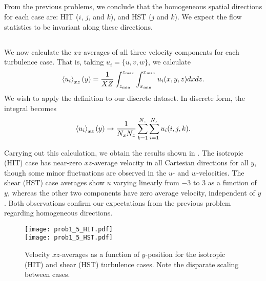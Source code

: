 \documentclass[11pt]{article}
\begin{document}
\subsection{}

From the previous problems, we conclude that the homogeneous spatial directions for each case are: HIT ($i$, $j$, and $k$), and HST ($j$ and $k$). We expect the flow statistics to be invariant along these directions.

\subsection{}

We now calculate the $xz$-averages of all three velocity components for each turbulence case. That is, taking $u_i = \{ u, v, w \}$, we calculate
\begin{equation}
\left< u_i \right>_{xz}(y)
=
\frac{1}{XZ}
\int_{z_\text{min}}^{z_\text{max}}
\int_{x_\text{min}}^{x_\text{max}}
u_i(x,y,z) dx dz
.
\end{equation}
We wish to apply the definition to our discrete dataset. In discrete form, the integral becomes
\begin{equation}
\left< u_i \right>_{xz}(y)
\rightarrow
\frac{1}{N_x N_z}
\sum_{k=1}^{N_z}
\sum_{i=1}^{N_x}
u_i(i,j,k)
.
\end{equation}

Carrying out this calculation, we obtain the results shown in . The isotropic (HIT) case has near-zero $xz$-average velocity in all Cartesian directions for all $y$, though some minor fluctuations are observed in the $u$- and $w$-velocities. The shear (HST) case averages show $u$ varying linearly from $-3$ to $3$ as a function of $y$, whereas the other two components have zero average velocity, independent of $y$. Both observations confirm our expectations from the previous problem regarding homogeneous directions.

\begin{figure}[t]
\centering
\texttt{[image: prob1\_5\_HIT.pdf]}
\\
\texttt{[image: prob1\_5\_HST.pdf]}
\\[6pt]
\caption{Velocity $xz$-averages as a function of $y$-position for the isotropic (HIT) and shear (HST) turbulence cases. Note the disparate scaling between cases.}
\label{fig:prob_1_5_xzaverages}
\end{figure}

\subsection{}
\end{document}
